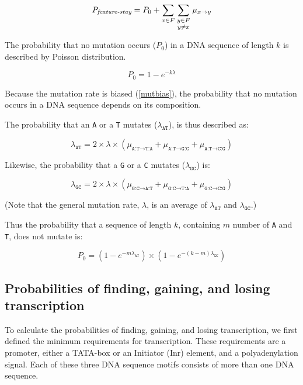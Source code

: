 \documentclass[12pt,a4paper]{article}
\begin{document}
\begin{equation}
P_\textit{feature-stay} = P_0 + \sum_{x \in F} \sum_{\genfrac{}{}{0pt}{1}{y \in F}{y\neq x}} \mu_{x\to y}
\end{equation}


The probability that no mutation occurs ($P_0$) in a DNA sequence of length $k$ is described by Poisson distribution. 

$$P_0 = 1-e^{-k\lambda}$$

Because the mutation rate is biased (\autoref{mutbias}), the probability that no mutation occurs in a DNA sequence depends on its composition. 

The probability that an \texttt{A} or a \texttt{T} mutates ($\lambda_\texttt{AT}$), is thus described as:

$$\lambda_\texttt{AT} = 2\times\lambda\times(\mu_{\texttt{A:T}\to\texttt{T:A}} + \mu_{\texttt{A:T}\to\texttt{G:C}} + \mu_{\texttt{A:T}\to\texttt{C:G}})$$

Likewise, the probability that a \texttt{G} or a \texttt{C} mutates ($\lambda_\texttt{GC}$) is: 

\vspace{-1ex}

$$\lambda_\texttt{GC} = 2\times\lambda\times(\mu_{\texttt{G:C}\to\texttt{A:T}} + \mu_{\texttt{G:C}\to\texttt{T:A}} + \mu_{\texttt{G:C}\to\texttt{C:G}})$$

(Note that the general mutation rate, $\lambda$, is an average of $\lambda_\texttt{AT}$ and $\lambda_\texttt{GC}$.)

\vspace{1\baselineskip}

Thus the probability that a sequence of length $k$, containing $m$ number of \texttt{A} and \texttt{T}, does not mutate is:

\vspace{-1ex}

$$P_0 = (1-e^{-m\lambda_\texttt{AT}})\times(1-e^{-(k-m)\lambda_\texttt{GC}})$$

\subsection{Probabilities of finding, gaining, and losing transcription}

\label{methRNA}
To calculate the probabilities of finding, gaining, and losing transcription, we first defined the minimum requirements for transcription. These requirements are a promoter, either a TATA-box or an Initiator (Inr) element, and a polyadenylation signal. Each of these three DNA sequence motifs consists of more than one DNA sequence.
\end{document}
